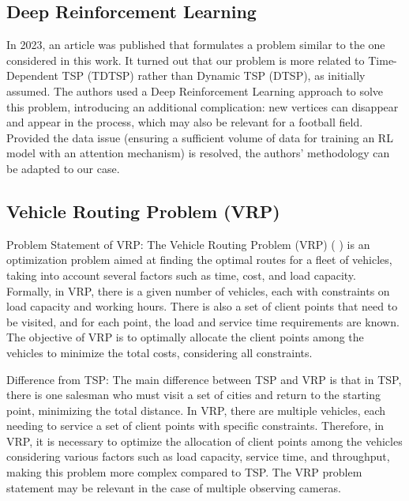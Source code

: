 \subsection{Deep Reinforcement Learning}
In 2023, an article \cite{RL} was published that formulates a problem similar to the one considered in this work. It turned out that our problem is more related to Time-Dependent TSP (TDTSP) rather than Dynamic TSP (DTSP), as initially assumed. 
The authors used a Deep Reinforcement Learning approach to solve this problem, introducing an additional complication: new vertices can disappear and appear in the process, which may also be relevant for a football field. Provided the data issue (ensuring a sufficient volume of data for training an RL model with an attention mechanism) is resolved, the authors' methodology can be adapted to our case.

\subsection{Vehicle Routing Problem (VRP)}

Problem Statement of VRP:
The Vehicle Routing Problem (VRP) (\cite{BIGRAS2008685} \cite{kool2019attention}) is an optimization problem aimed at finding the optimal routes for a fleet of vehicles, taking into account several factors such as time, cost, and load capacity. Formally, in VRP, there is a given number of vehicles, each with constraints on load capacity and working hours. There is also a set of client points that need to be visited, and for each point, the load and service time requirements are known. The objective of VRP is to optimally allocate the client points among the vehicles to minimize the total costs, considering all constraints.

Difference from TSP:
The main difference between TSP and VRP is that in TSP, there is one salesman who must visit a set of cities and return to the starting point, minimizing the total distance. In VRP, there are multiple vehicles, each needing to service a set of client points with specific constraints. Therefore, in VRP, it is necessary to optimize the allocation of client points among the vehicles considering various factors such as load capacity, service time, and throughput, making this problem more complex compared to TSP. The VRP problem statement may be relevant in the case of multiple observing cameras.

